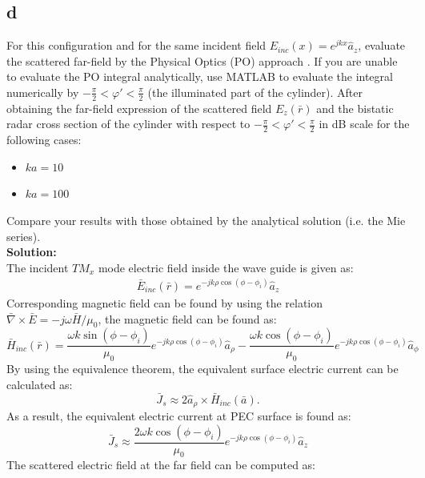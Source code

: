 \documentclass[11pt]{amsart}
\begin{document}
\subsection*{d}
For this configuration and for the same incident field $E_{inc}(x)=e^{jkx}\hat{a}_z$, evaluate the
scattered far-field by the Physical Optics (PO) approach . If you are unable to evaluate
the PO integral analytically, use MATLAB to evaluate the integral numerically by $-\frac{\pi}{2}< \varphi' <\frac{\pi}{2}$ (the illuminated part of the cylinder). After obtaining the far-field expression of the scattered field $E_z(\bar{r})$ and the bistatic radar cross section of the cylinder with respect to $-\frac{\pi}{2}< \varphi' <\frac{\pi}{2}$ in dB scale for the following cases:
\begin{itemize}
\item $ka=10$
\item $ka=100$
\end{itemize}
Compare your results with those obtained by the analytical solution (i.e. the Mie series).
\\
\textbf{Solution:}\\
The incident $TM_x$ mode electric field inside the wave guide is given as:
\begin{equation}
\label{eq:10}
\begin{split}
\bar{E}_{inc}(\bar{r})=e^{-j k \rho \cos (\phi-\phi_i) }\hat{a}_z
\end{split}
\end{equation}
Corresponding magnetic field can be found by using the relation $\bar{\nabla}\times \bar{E}=-j\omega \bar{H}/\mu_0$, the magnetic field can be found as:
\begin{equation}
\label{eq:11}
\bar{H}_{inc}(\bar{r})=\frac{\omega k \sin(\phi-\phi_i)}{\mu_0 }e^{-j k \rho \cos (\phi-\phi_i) }\hat{a}_{\rho}-\frac{\omega k \cos(\phi-\phi_i)}{\mu_0 }e^{-j k \rho \cos (\phi-\phi_i) }\hat{a}_{\phi}
\end{equation}
By using the equivalence theorem, the equivalent surface electric current can be calculated as:
\begin{equation}
\bar{J}_s \approx 2\hat{a}_{\rho}\times \bar{H}_{inc}(\bar{a}) .
\end{equation}
As a result, the equivalent electric current at PEC surface is found as:
\begin{equation}
\bar{J}_s \approx \frac{2\omega k \cos(\phi-\phi_i)}{\mu_0 }e^{-j k \rho \cos (\phi-\phi_i) }\hat{a}_{z}
\end{equation}
The scattered electric field at the far field can be computed as:
\end{document}
